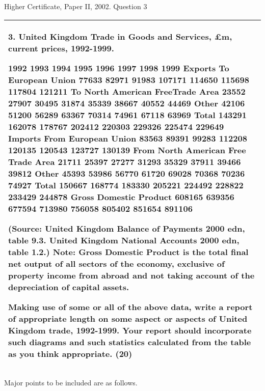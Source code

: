 \documentclass[a4paper,12pt]{article}
\begin{document}
Higher Certificate, Paper II, 2002.  Question 3 
\begin{table}[ht!]
 
\centering
 
\begin{tabular}{|p{15cm}|}
 
\hline  

 
3. United Kingdom Trade in Goods and Services, £m, current prices, 1992-1999. 
 
 1992 1993 1994 1995 1996 1997 1998 1999                   Exports                  To European Union   77633   82971   91983 107171 114650 115698 117804 121211 To North American FreeTrade Area   23552   27907   30495   31874   35339   38667   40552   44469 Other   42106   51200   56289   63367   70314   74961   67118   63969          Total 143291 162078 178767 202412 220303 229326 225474 229649                   Imports                  From European Union   83563   89391   99283 112208 120135 120543 123727 130139 From North American Free Trade Area   21711   25397   27277   31293   35329   37911   39466   39812 Other   45393   53986   56770   61720   69028   70368   70236   74927          Total 150667 168774 183330 205221 224492 228822 233429 244878                            Gross Domestic Product 608165 639356 677594 713980 756058 805402 851654 891106 
 
 
(Source: United Kingdom Balance of Payments 2000 edn, table 9.3.    United Kingdom National Accounts 2000 edn, table 1.2.) 
 Note:  Gross Domestic Product is the total final net output of all sectors of the economy, exclusive of 
property income from abroad and not taking account of the depreciation of capital assets. 
 
 
 
 
Making use of some or all of the above data, write a report of appropriate length on some aspect or aspects of United Kingdom trade, 1992-1999.  Your report should incorporate such diagrams and such statistics calculated from the table as you think appropriate. (20)  
\\ \hline
  
\end{tabular}

\end{table} 
Major points to be included are as follows.
\end{document}
